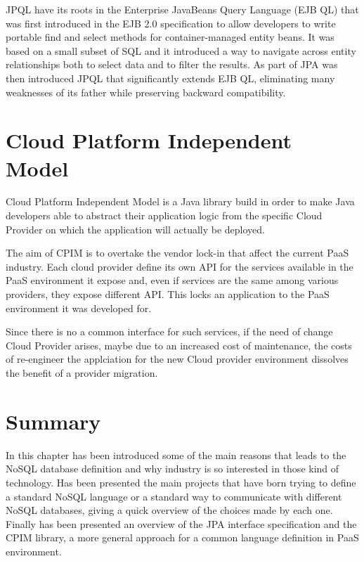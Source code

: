 \noindent JPQL have its roots in the Enterprise JavaBeans Query Language (EJB QL) that was first introduced in the EJB 2.0 specification to allow developers to write portable find and select methods for container-managed entity beans. It was based on a small subset of SQL and it introduced a way to navigate across entity relationships both to select data and to filter the results.
As part of JPA was then introduced JPQL that significantly extends EJB QL, eliminating many weaknesses of its father while preserving backward compatibility.

\section{Cloud Platform Independent Model}
\label{sec:cpim}
Cloud Platform Independent Model \cite{thesis:cpim} is a Java library build in order to make Java developers able to abstract their application logic from the specific Cloud Provider on which the application will actually be deployed.

\newparagraph The aim of CPIM is to overtake the vendor lock-in that affect the current PaaS industry. Each cloud provider define its own API for the services available in the PaaS environment it expose and, even if services are the same among various providers, they expose different API. This locks an application to the PaaS environment it was developed for.

\noindent Since there is no a common interface for such services, if the need of change Cloud Provider arises, maybe due to an increased cost of maintenance, the costs of re-engineer the applciation for the new Cloud provider environment dissolves the benefit of a provider migration.

\section{Summary}
In this chapter has been introduced some of the main reasons that leads to the NoSQL database definition and why industry is so interested in those kind of technology. 
\noindent Has been presented the main projects that have born trying to define a standard NoSQL language or a standard way to communicate with different NoSQL databases, giving a quick overview of the choices made by each one. 
\noindent Finally has been presented an overview of the JPA interface specification and the CPIM library, a more general approach for a common language definition in PaaS environment.
